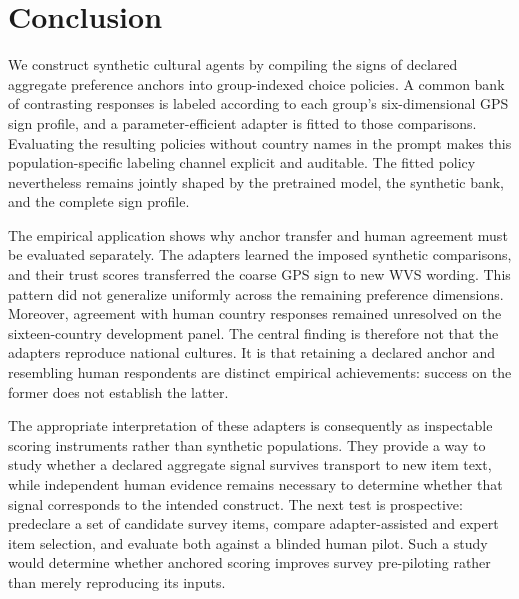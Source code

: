 \section{Conclusion}\label{sec:conclusion}

We construct synthetic cultural agents by compiling the signs of declared aggregate preference anchors into group-indexed choice policies. A common bank of contrasting responses is labeled according to each group’s six-dimensional GPS sign profile, and a parameter-efficient adapter is fitted to those comparisons. Evaluating the resulting policies without country names in the prompt makes this population-specific labeling channel explicit and auditable. The fitted policy nevertheless remains jointly shaped by the pretrained model, the synthetic bank, and the complete sign profile.

The empirical application shows why anchor transfer and human agreement must be evaluated separately. The adapters learned the imposed synthetic comparisons, and their trust scores transferred the coarse GPS sign to new WVS wording. This pattern did not generalize uniformly across the remaining preference dimensions. Moreover, agreement with human country responses remained unresolved on the sixteen-country development panel. The central finding is therefore not that the adapters reproduce national cultures. It is that retaining a declared anchor and resembling human respondents are distinct empirical achievements: success on the former does not establish the latter.

The appropriate interpretation of these adapters is consequently as inspectable scoring instruments rather than synthetic populations. They provide a way to study whether a declared aggregate signal survives transport to new item text, while independent human evidence remains necessary to determine whether that signal corresponds to the intended construct. The next test is prospective: predeclare a set of candidate survey items, compare adapter-assisted and expert item selection, and evaluate both against a blinded human pilot. Such a study would determine whether anchored scoring improves survey pre-piloting rather than merely reproducing its inputs.
